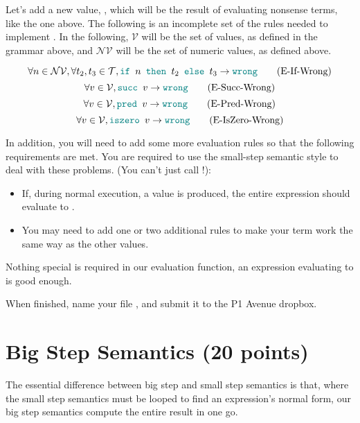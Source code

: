 \documentclass{exam}
\let\OldTexttt\texttt
\renewcommand{\texttt}[1]{\OldTexttt{\color{teal}{#1}}}
\begin{document}
Let's add a new value, \texttt{wrong}, which will be the result of evaluating nonsense terms, like the one above.  The following is an incomplete set of the rules needed to implement \texttt{wrong}.  In the following, $\mathcal{V}$ will be the set of values, as defined in the grammar above, and $\mathcal{NV}$ will be the set of numeric values, as defined above.

\begin{equation}
\forall n \in \mathcal{NV}, \forall t_2, t_3 \in \mathcal{T}, \texttt{if } n \texttt{ then } t_2 \texttt{ else } t_3 \rightarrow \texttt{wrong} \tag{E-If-Wrong}
\end{equation}
\begin{equation}
\forall v \in \mathcal{V}, \texttt{succ } v \rightarrow \texttt{wrong} \tag{E-Succ-Wrong}
\end{equation}
\begin{equation}
\forall v \in \mathcal{V}, \texttt{pred } v \rightarrow \texttt{wrong} \tag{E-Pred-Wrong}
\end{equation}
\begin{equation}
\forall v \in \mathcal{V}, \texttt{iszero } v \rightarrow \texttt{wrong} \tag{E-IsZero-Wrong}
\end{equation}

In addition, you will need to add some more evaluation rules so that the following requirements are met.  You are required to use the small-step semantic style to deal with these problems. (You can't just call \texttt{error}!):
\begin{itemize}
\item If, during normal execution, a \texttt{wrong} value is produced, the entire expression should evaluate to \texttt{wrong}.  
\item You may need to add one or two additional rules to make your \texttt{wrong} term work the same way as the other values. 
\end{itemize}

Nothing special is required in our evaluation function, an expression evaluating to \texttt{wrong} is good enough.  

When finished, name your file \texttt{UAE-2.hs}, and submit it to the P1 Avenue dropbox.

\section{Big Step Semantics (20 points)}
The essential difference between big step and small step semantics is that, where the small step semantics must be looped to find an expression's normal form, our big step semantics compute the entire result in one go.  \\
\end{document}
